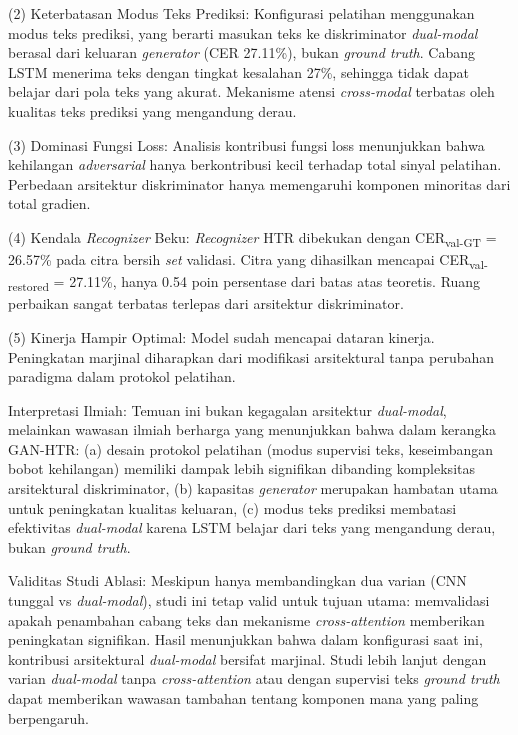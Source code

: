 \documentclass[journal]{IEEEtran}
\begin{document}
(2) Keterbatasan Modus Teks Prediksi: Konfigurasi pelatihan menggunakan modus teks prediksi, yang berarti masukan teks ke diskriminator \textit{dual-modal} berasal dari keluaran \textit{generator} (CER 27.11\%), bukan \textit{ground truth}. Cabang LSTM menerima teks dengan tingkat kesalahan 27\%, sehingga tidak dapat belajar dari pola teks yang akurat. Mekanisme atensi \textit{cross-modal} terbatas oleh kualitas teks prediksi yang mengandung derau.

(3) Dominasi Fungsi Loss: Analisis kontribusi fungsi loss menunjukkan bahwa kehilangan \textit{adversarial} hanya berkontribusi kecil terhadap total sinyal pelatihan. Perbedaan arsitektur diskriminator hanya memengaruhi komponen minoritas dari total gradien.

(4) Kendala \textit{Recognizer} Beku: \textit{Recognizer} HTR dibekukan dengan CER\textsubscript{val-GT} = 26.57\% pada citra bersih \textit{set} validasi. Citra yang dihasilkan mencapai CER\textsubscript{val-restored} = 27.11\%, hanya 0.54 poin persentase dari batas atas teoretis. Ruang perbaikan sangat terbatas terlepas dari arsitektur diskriminator.

(5) Kinerja Hampir Optimal: Model sudah mencapai dataran kinerja. Peningkatan marjinal diharapkan dari modifikasi arsitektural tanpa perubahan paradigma dalam protokol pelatihan.

Interpretasi Ilmiah: Temuan ini bukan kegagalan arsitektur \textit{dual-modal}, melainkan wawasan ilmiah berharga yang menunjukkan bahwa dalam kerangka GAN-HTR: (a) desain protokol pelatihan (modus supervisi teks, keseimbangan bobot kehilangan) memiliki dampak lebih signifikan dibanding kompleksitas arsitektural diskriminator, (b) kapasitas \textit{generator} merupakan hambatan utama untuk peningkatan kualitas keluaran, (c) modus teks prediksi membatasi efektivitas \textit{dual-modal} karena LSTM belajar dari teks yang mengandung derau, bukan \textit{ground truth}.

Validitas Studi Ablasi: Meskipun hanya membandingkan dua varian (CNN tunggal vs \textit{dual-modal}), studi ini tetap valid untuk tujuan utama: memvalidasi apakah penambahan cabang teks dan mekanisme \textit{cross-attention} memberikan peningkatan signifikan. Hasil menunjukkan bahwa dalam konfigurasi saat ini, kontribusi arsitektural \textit{dual-modal} bersifat marjinal. Studi lebih lanjut dengan varian \textit{dual-modal} tanpa \textit{cross-attention} atau dengan supervisi teks \textit{ground truth} dapat memberikan wawasan tambahan tentang komponen mana yang paling berpengaruh.
\end{document}
